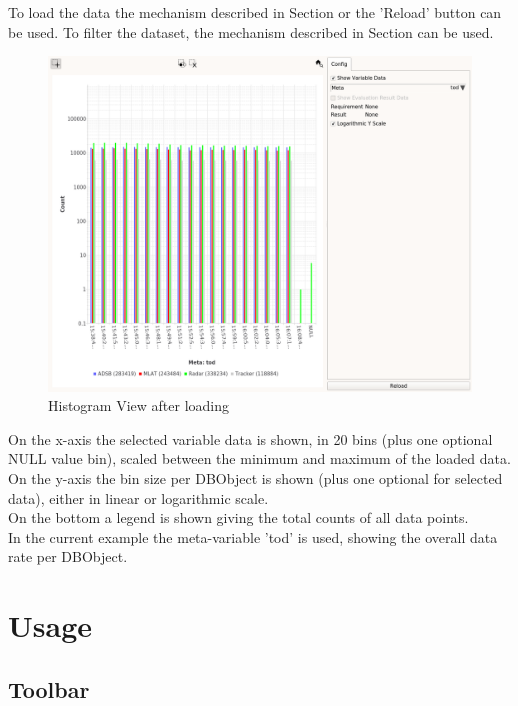 To load the data the mechanism described in Section  or the 'Reload' button can be used. To filter the dataset, the mechanism described in Section  can be used. \\

\begin{figure}[H]
    \hspace*{-2cm}
    \includegraphics[width=18cm,frame]{figures/histogram_loaded.png}
  \caption{Histogram View after loading}
\end{figure}

On the x-axis the selected variable data is shown, in 20 bins (plus one optional NULL value bin), scaled between the minimum and maximum of the loaded data. On the y-axis the bin size per DBObject is shown (plus one optional for selected data), either in linear or logarithmic scale. \\


On the bottom a legend is shown giving the total counts of all data points. \\

In the current example the meta-variable 'tod' is used, showing the overall data rate per DBObject.


\section{Usage}

\subsection{Toolbar}

